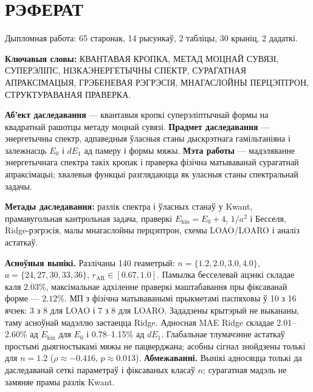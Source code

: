 \chapter*{РЭФЕРАТ}
\vspace{-1cm}

Дыпломная работа: 65 старонак, 14 рысункаў, 2 табліцы, 30 крыніц, 2 дадаткі.

\textbf{Ключавыя словы:} КВАНТАВАЯ КРОПКА, МЕТАД МОЦНАЙ СУВЯЗІ, СУПЕРЭЛІПС,
НІЗКАЭНЕРГЕТЫЧНЫ СПЕКТР, СУРАГАТНАЯ АПРАКСІМАЦЫЯ,
ГРЭБЕНЕВАЯ РЭГРЭСІЯ, МНАГАСЛОЙНЫ ПЕРЦЭПТРОН,
СТРУКТУРАВАНАЯ ПРАВЕРКА.\par

\textbf{Аб'ект даследавання} --- квантавыя кропкі суперэліптычнай формы на квадратнай рашотцы метаду моцнай сувязі. \textbf{Прадмет даследавання} --- энергетычны спектр, адпаведныя ўласныя станы дыскрэтнага гамільтаніяна і залежнасць \(E_0\) і \(dE_1\) ад памеру і формы мяжы. \textbf{Мэта работы} --- мадэляванне энергетычнага спектра такіх кропак і праверка фізічна матываванай сурагатнай апраксімацыі; хвалевыя функцыі разглядаюцца як уласныя станы спектральнай задачы.

\textbf{Метады даследавання:} разлік спектра і ўласных станаў у Kwant, прамавугольная кантрольная задача, праверкі \(E_{\mathrm{kin}}=E_0+4\), \(1/a^2\) і Бесселя, Ridge-рэгрэсія, малы мнагаслойны перцэптрон, схемы LOAO/LOARO і аналіз астаткаў.

\textbf{Асноўныя вынікі.} Разлічаны 140 геаметрый: \(n=\{1.2,2.0,3.0,4.0\}\), \(a=\{24,27,30,33,36\}\), \(r_{\mathrm{AR}}\in[0.67,1.0]\). Памылка бесселевай ацэнкі складае каля \(2.03\%\), максімальнае адхіленне праверкі маштабавання пры фіксаванай форме --- \(2.12\%\). МП з фізічна матываванымі прыкметамі паспяховы ў 10 з 16 ячэек: 3 з 8 для LOAO і 7 з 8 для LOARO. Зададзены крытэрый не выкананы, таму асноўнай мадэллю застаецца Ridge. Адносная MAE Ridge складае 2.01--2.60\% ад \(E_{\mathrm{kin}}\) для \(E_0\) і 0.78--1.15\% ад \(dE_1\). Глабальнае тлумачэнне астаткаў простымі дыягностыкамі мяжы не пацверджана; асобны сігнал знойдзены толькі для \(n=1.2\) (\(\rho\approx -0.416\), \(p\approx0.013\)). \textbf{Абмежаванні.} Вынікі адносяцца толькі да даследаванай сеткі параметраў і фіксаваных класаў \(n\); сурагатная мадэль не замяняе прамы разлік Kwant.
\par
